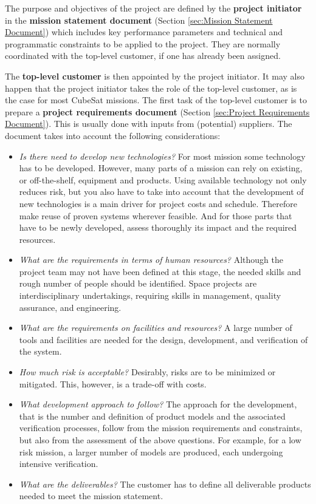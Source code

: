 The purpose and objectives of the project are defined by the \textbf{project initiator} in the \textbf{mission statement document} (Section \ref{sec:Mission Statement Document}) which includes key performance parameters and technical and programmatic constraints to be applied to the project. They are normally coordinated with the top-level customer, if one has already been assigned.

The \textbf{top-level customer} is then appointed by the project initiator. It may also happen that the project initiator takes the role of the top-level customer, as is the case for most CubeSat missions. The first task of the top-level customer is to prepare a \textbf{project requirements document} (Section \ref{sec:Project Requirements Document}). This is usually done with inputs from (potential) suppliers. The document takes into account the following considerations:

\begin{itemize}

\item \textit{Is there need to develop new technologies?} For most mission some technology has to be developed. However, many parts of a mission can rely on existing, or off-the-shelf, equipment and products. Using available technology not only reduces risk, but you also have to take into account that the development of new technologies is a main driver for project costs and schedule. Therefore make reuse of proven systems wherever feasible. And for those parts that have to be newly developed, assess thoroughly its impact and the required resources.

\item \textit{What are the requirements in terms of human resources?} Although the project team may not have been defined at this stage, the needed skills and rough number of people should be identified. Space projects are interdisciplinary undertakings, requiring skills in management, quality assurance, and engineering. 

\item \textit{What are the requirements on facilities and resources?} A large number of tools and facilities are needed for the design, development, and verification of the system. 

\item \textit{How much risk is acceptable?} Desirably, risks are to be minimized or mitigated. This, however, is a trade-off with costs. 

\item \textit{What development approach to follow?} The approach for the development, that is the number and definition of product models and the associated verification processes, follow from the mission requirements and constraints, but also from the assessment of the above questions. For example, for a low risk mission, a larger number of models are produced, each undergoing intensive verification.

\item \textit{What are the deliverables?} The customer has to define all deliverable products needed to meet the mission statement.

\end{itemize}


